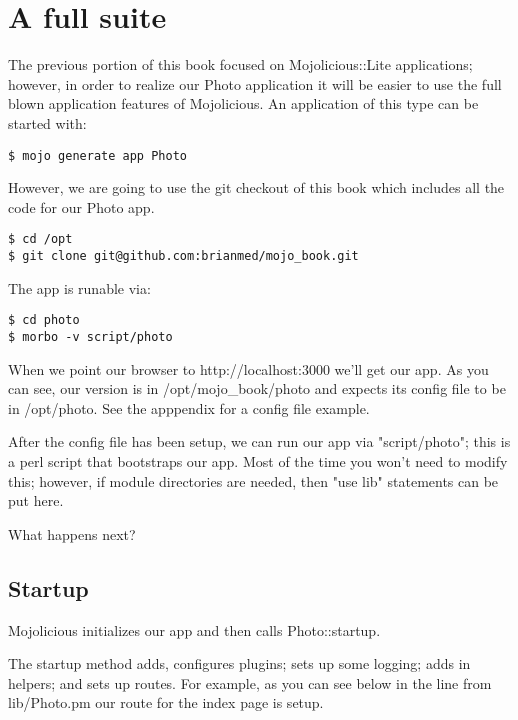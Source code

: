\documentclass[14pt]{extreport}
\newcommand\Small{\fontsize{10}{10.2}\selectfont}
\newcommand*\LSTfont{\Small\ttfamily\SetTracking{encoding=*}{-60}\lsstyle}
\begin{document}
\section{A full suite}

The previous portion of this book focused on Mojolicious::Lite applications;
however, in order to realize our Photo application it will be easier to use the
full blown application features of Mojolicious.  An application of this type
can be started with:

\begin{lstlisting}[style=BashInputStyle]
$ mojo generate app Photo
\end{lstlisting}

However, we are going to use the git checkout of this book which includes all the 
code for our Photo app.

\begin{lstlisting}[style=BashOutputStyle]
$ cd /opt
$ git clone git@github.com:brianmed/mojo_book.git
\end{lstlisting}

The app is runable via:

\begin{lstlisting}[style=BashInputStyle]
$ cd photo
$ morbo -v script/photo
\end{lstlisting}

When we point our browser to http://localhost:3000 we'll get our app.  As you
can see, our version is in /opt/mojo\_book/photo and expects its config file to
be in /opt/photo.  See the apppendix for a config file example.

After the config file has been setup, we can run our app via "script/photo";
this is a perl script that bootstraps our app.  Most of the time you won't need
to modify this; however, if module directories are needed, then "use lib" statements
can be put here.

What happens next?

\subsection{Startup}

Mojolicious initializes our app and then calls Photo::startup.

The startup method adds, configures plugins; sets up some logging; adds in
helpers; and sets up routes.  For example, as you can see below in the line from
lib/Photo.pm our route for the index page is setup.


\end{document}
